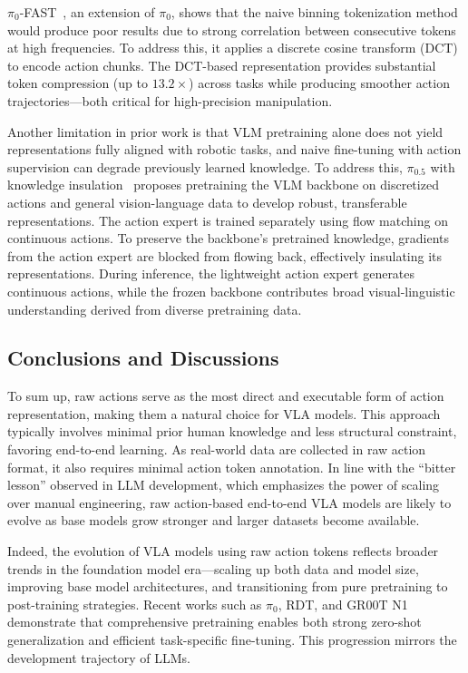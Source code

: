 \documentclass[10pt, a4paper, logo, copyright]{googledeepmind} %
\begin{document}
$\pi_0$-FAST~\cite{Pi0-FAST}, an extension of $\pi_0$, shows that the naive binning tokenization method would produce poor results due to strong correlation between consecutive tokens at high frequencies. To address this, it applies a discrete cosine transform (DCT) to encode action chunks. The DCT-based representation provides substantial token compression (up to $13.2\times$) across tasks while producing smoother action trajectories---both critical for high-precision manipulation.

Another limitation in prior work is that VLM pretraining alone does not yield representations fully aligned with robotic tasks, and naive fine-tuning with action supervision can degrade previously learned knowledge. To address this, $\pi_{0.5}$ with knowledge insulation~\cite{driess2025knowledge} proposes pretraining the VLM backbone on discretized actions and general vision-language data to develop robust, transferable representations. The action expert is trained separately using flow matching on continuous actions. To preserve the backbone’s pretrained knowledge, gradients from the action expert are blocked from flowing back, effectively insulating its representations. During inference, the lightweight action expert generates continuous actions, while the frozen backbone contributes broad visual-linguistic understanding derived from diverse pretraining data.

\subsection{Conclusions and Discussions}

To sum up, raw actions serve as the most direct and executable form of action representation, making them a natural choice for VLA models. This approach typically involves minimal prior human knowledge and less structural constraint, favoring end-to-end learning. As real-world data are collected in raw action format, it also requires minimal action token annotation. In line with the ``bitter lesson'' observed in LLM development, which emphasizes the power of scaling over manual engineering, raw action-based end-to-end VLA models are likely to evolve as base models grow stronger and larger datasets become available.

Indeed, the evolution of VLA models using raw action tokens reflects broader trends in the foundation model era---scaling up both data and model size, improving base model architectures, and transitioning from pure pretraining to post-training strategies. Recent works such as $\pi_0$, RDT, and GR00T N1 demonstrate that comprehensive pretraining enables both strong zero-shot generalization and efficient task-specific fine-tuning. This progression mirrors the development trajectory of LLMs. 
\end{document}
